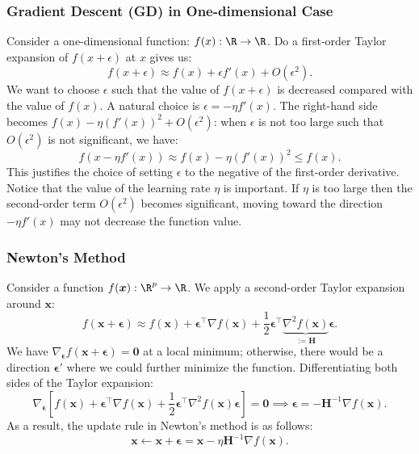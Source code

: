     \subsubsection{Gradient Descent (GD) in One-dimensional Case}
    Consider a one-dimensional function: $f(x): \R \rightarrow \R$.
    Do a first-order Taylor expansion of $f(x + \epsilon)$ at $x$ gives us:
        \begin{equation}
                f(x + \epsilon) \approx f(x) + \epsilon f'(x) + O(\epsilon^2).
        \end{equation}
    We want to choose $\epsilon$ such that the value of $f(x + \epsilon)$ is decreased compared with the value of $f(x)$.
    A natural choice is $\epsilon = -\eta f'(x)$.
    The right-hand side becomes $f(x) - \eta (f'(x))^2 + O(\epsilon^2)$: when $\epsilon$ is not too large such that $O(\epsilon^2)$ is not significant, we have:
        \begin{equation}
            f(x - \eta f'(x)) \approx f(x) - \eta (f'(x))^2 \le f(x).
        \end{equation}
    This justifies the choice of setting $\epsilon$ to the negative of the first-order derivative.
    Notice that the value of the learning rate $\eta$ is important.
    If $\eta$ is too large then the second-order term $O(\epsilon^2)$ becomes significant, moving toward the direction $-\eta f'(x)$ may not decrease the function value.
    
    \subsubsection{Newton's Method}\label{newton-method}
        Consider a function $f(\bm{x}): \R^\nfeat \rightarrow \R$.
        We apply a second-order Taylor expansion around $\bm{x}$:
            \begin{equation}
                f(\bm{x} + \bm{\epsilon}) \approx f(\bm{x}) + \bm{\epsilon}^{\top} \nabla f(\bm{x}) + \frac{1}{2} \bm{\epsilon}^\top \underbrace{\nabla^2 f(\bm{x}) }_{:=\bm{H}}\bm{\epsilon}.
            \end{equation}
        We have $\nabla_{\bm{\epsilon}} f(\bm{x}+\bm{\epsilon}) = \bm{0}$ at a local minimum; otherwise, there would be a direction $\bm{\epsilon}'$ where we could further minimize the function.
        Differentiating both sides of the Taylor expansion:
            \begin{equation}
                \nabla_{\bm{\epsilon}}\left[ f(\bm{x}) + \bm{\epsilon}^{\top} \nabla f(\bm{x}) + \frac{1}{2} \bm{\epsilon}^\top \nabla^2 f(\bm{x}) \bm{\epsilon}\right] = \bm{0} \implies \bm{\epsilon} = -\bm{H}^{-1} \nabla f(\bm{x}).
            \end{equation}
        As a result, the update rule in Newton's method is as follows:
            \begin{equation}
                \bm{x} \leftarrow \bm{x} + \bm{\epsilon} = \bm{x} - \eta \bm{H}^{-1} \nabla f(\bm{x}).
            \end{equation}
    
